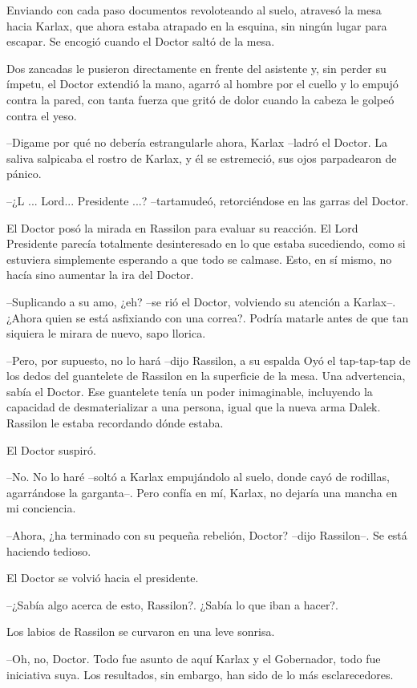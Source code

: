 Enviando con cada paso documentos revoloteando al suelo, atravesó la mesa hacia Karlax, que ahora estaba atrapado en la esquina, sin ningún lugar para escapar. Se encogió cuando el Doctor saltó de la mesa.

Dos zancadas le pusieron directamente en frente del asistente y, sin perder su ímpetu, el Doctor extendió la mano, agarró al hombre por el cuello y lo empujó contra la pared, con tanta fuerza que gritó de dolor cuando la cabeza le golpeó contra el yeso.

--Digame por qué no debería estrangularle ahora, Karlax --ladró el Doctor. La saliva salpicaba el rostro de Karlax, y él se estremeció, sus ojos parpadearon de pánico.

--¿L ... Lord... Presidente ...? --tartamudeó, retorciéndose en las garras del Doctor.

El Doctor posó la mirada en Rassilon para evaluar su reacción. El Lord Presidente parecía totalmente desinteresado en lo que estaba sucediendo, como si estuviera simplemente esperando a que todo se calmase. Esto, en sí mismo, no hacía sino aumentar la ira del Doctor.

--Suplicando a su amo, ¿eh? --se rió el Doctor, volviendo su atención a Karlax--. ¿Ahora quien se está asfixiando con una correa?. Podría matarle antes de que tan siquiera le mirara de nuevo, sapo llorica.

--Pero, por supuesto, no lo hará --dijo Rassilon, a su espalda Oyó el tap-tap-tap de los dedos del guantelete de Rassilon en la superficie de la mesa. Una advertencia, sabía el Doctor. Ese guantelete tenía un poder inimaginable, incluyendo la capacidad de desmaterializar a una persona, igual que la nueva arma Dalek. Rassilon le estaba recordando dónde estaba.

El Doctor suspiró. 

--No. No lo haré --soltó a Karlax empujándolo al suelo, donde cayó de rodillas, agarrándose la garganta--. Pero confía en mí, Karlax, no dejaría una mancha en mi conciencia.

--Ahora, ¿ha terminado con su pequeña rebelión, Doctor? --dijo Rassilon--. Se está haciendo tedioso.

El Doctor se volvió hacia el presidente. 

--¿Sabía algo acerca de esto, Rassilon?. ¿Sabía lo que iban a hacer?.

Los labios de Rassilon se curvaron en una leve sonrisa. 

--Oh, no, Doctor. Todo fue asunto de aquí Karlax y el Gobernador, todo fue iniciativa suya. Los resultados, sin embargo, han sido de lo más esclarecedores.

